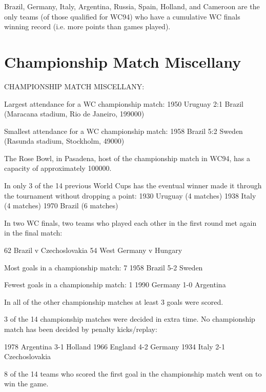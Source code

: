 Brazil, Germany, Italy, Argentina, Russia, Spain, Holland, and Cameroon are the
only teams (of those qualified for WC94) who have a cumulative WC finals 
winning record (i.e. more points than games played).
\section{Championship Match Miscellany}
CHAMPIONSHIP MATCH MISCELLANY:

Largest attendance for a WC championship match:
1950 Uruguay 2:1 Brazil (Maracana stadium, Rio de Janeiro, 199000)

Smallest attendance for a WC championship match:
1958 Brazil 5:2 Sweden (Rasunda stadium, Stockholm, 49000)

The Rose Bowl, in Pasadena, host of the championship match in WC94, has a 
capacity of approximately 100000.

In only 3 of the 14 previous World Cups has the eventual winner made it through
the tournament without dropping a point:
1930 Uruguay (4 matches)
1938 Italy (4 matches)
1970 Brazil (6 matches)

In two WC finals, two teams who played each other in the first round met again 
in the final match:

62 Brazil v Czechoslovakia
54 West Germany v Hungary

Most goals in a championship match: 7
1958 Brazil 5-2 Sweden

Fewest goals in a championship match: 1
1990 Germany 1-0 Argentina

In all of the other championship matches at least 3 goals were scored.

3 of the 14 championship matches were decided in extra time. No championship 
match has been decided by penalty kicks/replay:

1978 Argentina 3-1 Holland
1966 England 4-2 Germany
1934 Italy 2-1 Czechoslovakia

8 of the 14 teams who scored the first goal in the championship match went on 
to win the game.
